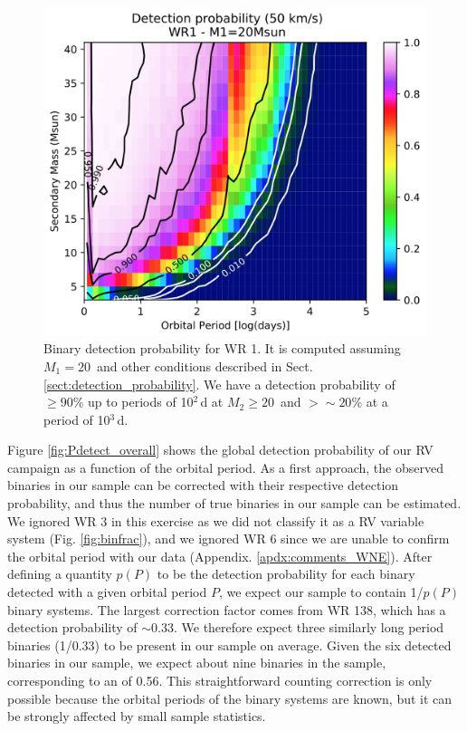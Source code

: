 \begin{figure}[t]
    \centering
    \includegraphics[width=\textwidth]{chapters/WNE/image/Pdetect_WR1.png}
    \caption{Binary detection probability for WR 1. It is computed assuming $M_1 = 20$\,\Msun{} and other conditions described in Sect. \ref{sect:detection_probability}. We have a detection probability of $\ge90$\% up to periods of 10$^2$\,d at $M_2\ge20$\,\Msun{} and $>{\sim}20$\% at a period of 10$^3$\,d.}
    \label{fig:Pdetect_WR1}
\end{figure}

Figure \ref{fig:Pdetect_overall} shows the global detection probability of our RV campaign as a function of the orbital period. As a first approach, the observed binaries in our sample can be corrected with their respective detection probability, and thus the number of true binaries in our sample can be estimated. We ignored WR 3 in this exercise as we did not classify it as a RV variable system (Fig. \ref{fig:binfrac}), and we ignored WR 6 since we are unable to confirm the orbital period with our data (Appendix. \ref{apdx:comments_WNE}). After defining a quantity $p(P)$ to be the detection probability for each binary detected with a given orbital period $P$, we expect our sample to contain 1/$p(P)$ binary systems. The largest correction factor comes from WR 138, which has a detection probability of ${\sim}0.33$. We therefore expect three similarly long period binaries (1/0.33) to be present in our sample on average. Given the six detected binaries in our sample, we expect about nine binaries in the sample, corresponding to an \fintWNE{} of 0.56. This straightforward counting correction is only possible because the orbital periods of the binary systems are known, but it can be strongly affected by small sample statistics.


